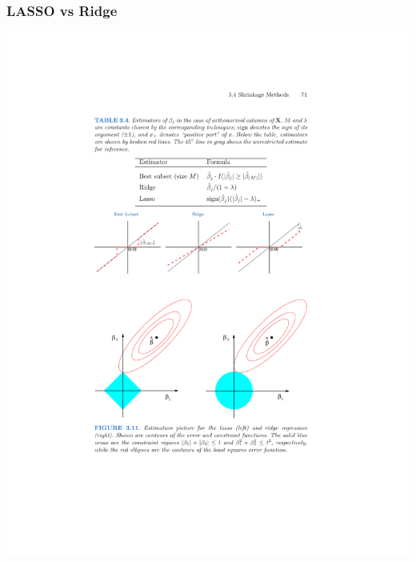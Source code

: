 \begin{frame}
\frametitle{LASSO vs Ridge}
\begin{center}
\includegraphics[height=0.85\textheight]{./resources/geometry}
\end{center}
\end{frame}


